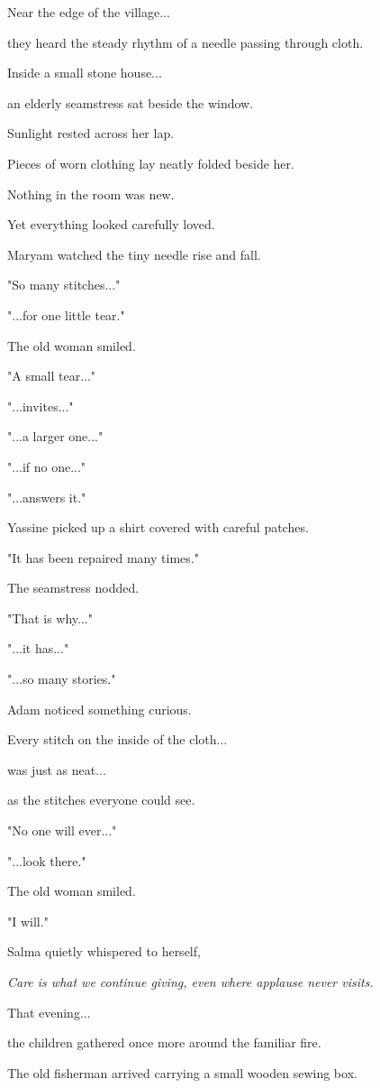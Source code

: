 \documentclass[12pt,openany]{book}
\begin{document}
Near the edge of the village...

they heard the steady rhythm of a needle passing through cloth.

Inside a small stone house...

an elderly seamstress sat beside the window.

Sunlight rested across her lap.

Pieces of worn clothing lay neatly folded beside her.

Nothing in the room was new.

Yet everything looked carefully loved.

Maryam watched the tiny needle rise and fall.

"So many stitches..."

"...for one little tear."

The old woman smiled.

"A small tear..."

"...invites..."

"...a larger one..."

"...if no one..."

"...answers it."

Yassine picked up a shirt covered with careful patches.

"It has been repaired many times."

The seamstress nodded.

"That is why..."

"...it has..."

"...so many stories."

Adam noticed something curious.

Every stitch on the inside of the cloth...

was just as neat...

as the stitches everyone could see.

"No one will ever..."

"...look there."

The old woman smiled.

"I will."

Salma quietly whispered to herself,

\emph{Care is what we continue giving, even where applause never visits.}

That evening...

the children gathered once more around the familiar fire.

The old fisherman arrived carrying a small wooden sewing box.
\end{document}
